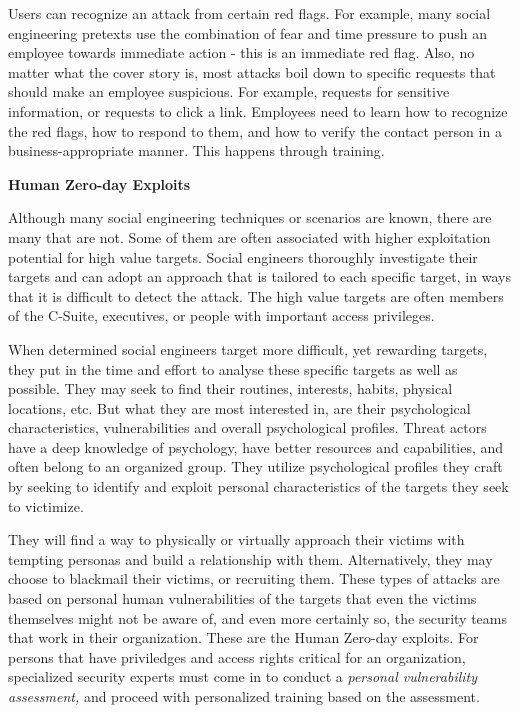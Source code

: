 Users can recognize an attack from certain red flags. For example, many social engineering pretexts use the combination of fear and time pressure to push an employee towards immediate action - this is an immediate red flag. Also, no matter what the cover story is, most attacks boil down to specific requests that should make an employee suspicious. For example, requests for sensitive information, or requests to click a link. Employees need to learn how to recognize the red flags, how to respond to them, and how to verify the contact person in a business-appropriate manner. This happens through training.

\textbf{Human Zero-day Exploits}

Although many social engineering techniques or scenarios are known, there are many that are not. Some of them are often associated with higher exploitation potential for high value targets. Social engineers thoroughly investigate their targets and can adopt an approach that is tailored to each specific target, in ways that it is difficult to detect the attack. The high value targets are often members of the C-Suite, executives, or people with important access privileges.

When determined social engineers target more difficult, yet rewarding targets, they put in the time and effort to analyse these specific targets as well as possible. They may seek to find their routines, interests, habits, physical locations, etc. But what they are most interested in, are their psychological characteristics, vulnerabilities and overall psychological profiles. Threat actors have a deep knowledge of psychology, have better resources and capabilities, and often belong to an organized group. They utilize psychological profiles they craft by seeking to identify and exploit personal characteristics of the targets they seek to victimize.

They will find a way to physically or virtually approach their victims with tempting personas and build a relationship with them. Alternatively, they may choose to blackmail their victims, or recruiting them. These types of attacks are based on personal human vulnerabilities of the targets that even the victims themselves might not be aware of, and even more certainly so, the security teams that work in their organization. These are the Human Zero-day exploits. For persons that have priviledges and access rights critical for an organization, specialized security experts must come in to conduct a \textit{personal vulnerability assessment,} and proceed with personalized training based on the assessment.

